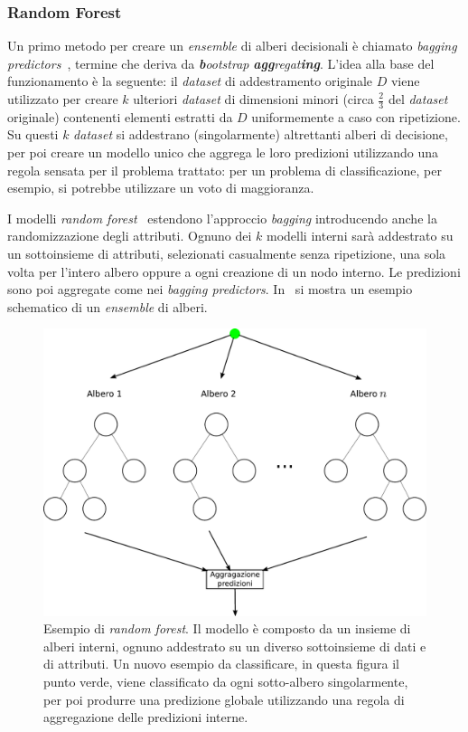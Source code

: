 \subsubsection{Random Forest}
Un primo metodo per creare un \emph{ensemble} di alberi decisionali è chiamato \emph{bagging predictors}~\cite{bagging_predictors}, termine che deriva da \emph{\textbf{b}ootstrap} \emph{\textbf{agg}regat\textbf{ing}}.
L'idea alla base del funzionamento è la seguente: il \emph{dataset} di addestramento originale $D$ viene utilizzato per creare $k$ ulteriori \emph{dataset} di dimensioni minori (circa $\frac{2}{3}$ del \emph{dataset} originale) contenenti elementi estratti da $D$ uniformemente a caso con ripetizione.
Su questi $k$ \emph{dataset} si addestrano (singolarmente) altrettanti alberi di decisione, per poi creare un modello unico che aggrega le loro predizioni utilizzando una regola sensata per il problema trattato: per un problema di classificazione, per esempio, si potrebbe utilizzare un voto di maggioranza.

I modelli \emph{random forest}~\cite{random_forest} estendono l'approccio \emph{bagging} introducendo anche la randomizzazione degli attributi. 
Ognuno dei $k$ modelli interni sarà addestrato su un sottoinsieme  di attributi, selezionati casualmente senza ripetizione, una sola volta per l'intero albero oppure a ogni creazione di un nodo interno.
Le predizioni sono poi aggregate come nei \emph{bagging predictors}.
In~ si mostra un esempio schematico di un \emph{ensemble} di alberi.

\begin{figure}
    \centering
    \includegraphics[width=0.7\linewidth]{img/random_forest.pdf}
    \caption{Esempio di \emph{random forest}. Il modello è composto da un insieme di alberi interni, ognuno addestrato su un diverso sottoinsieme di dati e di attributi. Un nuovo esempio da classificare, in questa figura il punto verde, viene classificato da ogni sotto-albero singolarmente, per poi produrre una predizione globale utilizzando una regola di aggregazione delle predizioni interne.}
    \label{fig:random_forest}
\end{figure}

